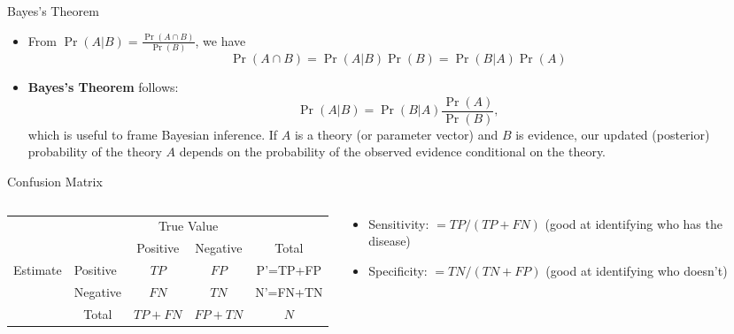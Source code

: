\documentclass[aspectratio=169,11pt]{beamer}
\begin{document}
\begin{frame}{Bayes's Theorem}
\begin{itemize}
	\item From $\Pr\left(A|B\right) = \frac{\Pr\left(A \cap B\right)}{\Pr(B)}$, we have\[
		\Pr\left(A \cap B\right) = \Pr\left(A|B\right) \Pr(B) =  \Pr\left(B|A\right) \Pr(A)
	\]
	
	\medskip
	\item {\bf Bayes's Theorem} follows:\[
		\Pr\left(A|B\right) =  \Pr\left(B|A\right) \frac{ \Pr(A)}{\Pr(B) },
	\]
	which is useful to frame Bayesian inference. If $A$ is a theory (or parameter vector) and $B$ is evidence,
	our updated (posterior) probability of the theory $A$ depends on the probability of the observed evidence conditional on the theory. 
	
	
\end{itemize}
\end{frame}

\begin{frame}{Confusion Matrix}
\begin{columns}
\begin{column}{0.6\textwidth}
\begin{tabular}{l|l|c|c|c}
\multicolumn{2}{c}{}&\multicolumn{2}{c}{True Value}&\\ 
\cmidrule{3-4}
\multicolumn{2}{c|}{}&Positive&Negative&\multicolumn{1}{c}{Total}\\
\cmidrule{2-4}
\multirow{2}{*}{Estimate}& Positive & $TP$ & $ FP$ & P'=TP+FP\\
\cmidrule{2-4}
& Negative & $ FN $ & $ TN $ & N'=FN+TN\\
\cmidrule{2-4}
\multicolumn{1}{c}{} & \multicolumn{1}{c}{Total} & \multicolumn{1}{c}{$TP+FN$} & \multicolumn{    1}{c}{$FP+TN$} & \multicolumn{1}{c}{$N$}\\
\end{tabular}
\end{column}
\begin{column}{0.4\textwidth}
\begin{itemize}
	\item Sensitivity: $=TP/(TP + FN)$ (good at identifying who has the disease)
	\item Specificity: $=TN/(TN + FP)$ (good at identifying who doesn't)
\end{itemize}
\end{column}
\end{columns}
\end{frame}
\end{document}
